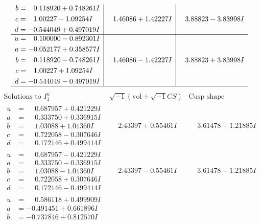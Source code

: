 \documentclass[1p]{elsarticle_modified}
\theoremstyle{definition}
\newcommand{\I}{\sqrt{-1}}
\begin{document}
$$\begin{array}{c|c|c}
\begin{aligned}
b &= \phantom{-}0.118920 + 0.748261 I \\
c &= \phantom{-}1.00227 - 1.09254 I \\
d &= -0.544049 + 0.497019 I\end{aligned}
 & \phantom{-}1.46086 + 1.42227 I & \phantom{-}3.88823 - 3.83998 I \\ \hline\begin{aligned}
u &= \phantom{-}0.100000 - 0.892301 I \\
a &= -0.052177 + 0.358577 I \\
b &= \phantom{-}0.118920 - 0.748261 I \\
c &= \phantom{-}1.00227 + 1.09254 I \\
d &= -0.544049 - 0.497019 I\end{aligned}
 & \phantom{-}1.46086 - 1.42227 I & \phantom{-}3.88823 + 3.83998 I\\
 \hline 
 \end{array}$$\newpage$$\begin{array}{c|c|c}  
\text{Solutions to }I^u_{1}& \I (\text{vol} + \sqrt{-1}CS) & \text{Cusp shape}\\
 \hline 
\begin{aligned}
u &= \phantom{-}0.687957 + 0.421229 I \\
a &= \phantom{-}0.333750 + 0.336915 I \\
b &= \phantom{-}1.03088 + 1.01360 I \\
c &= \phantom{-}0.722058 - 0.307646 I \\
d &= \phantom{-}0.172146 + 0.499414 I\end{aligned}
 & \phantom{-}2.43397 + 0.55461 I & \phantom{-}3.61478 + 1.21885 I \\ \hline\begin{aligned}
u &= \phantom{-}0.687957 - 0.421229 I \\
a &= \phantom{-}0.333750 - 0.336915 I \\
b &= \phantom{-}1.03088 - 1.01360 I \\
c &= \phantom{-}0.722058 + 0.307646 I \\
d &= \phantom{-}0.172146 - 0.499414 I\end{aligned}
 & \phantom{-}2.43397 - 0.55461 I & \phantom{-}3.61478 - 1.21885 I \\ \hline\begin{aligned}
u &= \phantom{-}0.586118 + 0.499909 I \\
a &= -0.491451 + 0.661896 I \\
b &= -0.737846 + 0.812570 I \\

\end{aligned}
\end{array}$$
\end{document}
